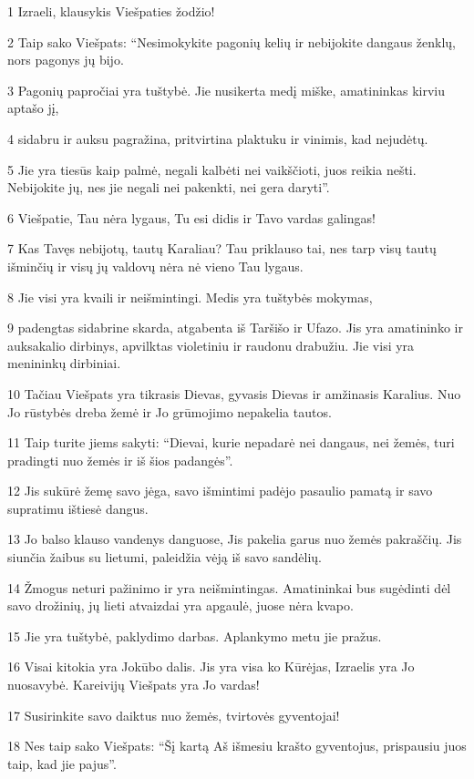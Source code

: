 \par 1 Izraeli, klausykis Viešpaties žodžio! 
\par 2 Taip sako Viešpats: “Nesimokykite pagonių kelių ir nebijokite dangaus ženklų, nors pagonys jų bijo. 
\par 3 Pagonių papročiai yra tuštybė. Jie nusikerta medį miške, amatininkas kirviu aptašo jį, 
\par 4 sidabru ir auksu pagražina, pritvirtina plaktuku ir vinimis, kad nejudėtų. 
\par 5 Jie yra tiesūs kaip palmė, negali kalbėti nei vaikščioti, juos reikia nešti. Nebijokite jų, nes jie negali nei pakenkti, nei gera daryti”. 
\par 6 Viešpatie, Tau nėra lygaus, Tu esi didis ir Tavo vardas galingas! 
\par 7 Kas Tavęs nebijotų, tautų Karaliau? Tau priklauso tai, nes tarp visų tautų išminčių ir visų jų valdovų nėra nė vieno Tau lygaus. 
\par 8 Jie visi yra kvaili ir neišmintingi. Medis yra tuštybės mokymas, 
\par 9 padengtas sidabrine skarda, atgabenta iš Taršišo ir Ufazo. Jis yra amatininko ir auksakalio dirbinys, apvilktas violetiniu ir raudonu drabužiu. Jie visi yra menininkų dirbiniai. 
\par 10 Tačiau Viešpats yra tikrasis Dievas, gyvasis Dievas ir amžinasis Karalius. Nuo Jo rūstybės dreba žemė ir Jo grūmojimo nepakelia tautos. 
\par 11 Taip turite jiems sakyti: “Dievai, kurie nepadarė nei dangaus, nei žemės, turi pradingti nuo žemės ir iš šios padangės”. 
\par 12 Jis sukūrė žemę savo jėga, savo išmintimi padėjo pasaulio pamatą ir savo supratimu ištiesė dangus. 
\par 13 Jo balso klauso vandenys danguose, Jis pakelia garus nuo žemės pakraščių. Jis siunčia žaibus su lietumi, paleidžia vėją iš savo sandėlių. 
\par 14 Žmogus neturi pažinimo ir yra neišmintingas. Amatininkai bus sugėdinti dėl savo drožinių, jų lieti atvaizdai yra apgaulė, juose nėra kvapo. 
\par 15 Jie yra tuštybė, paklydimo darbas. Aplankymo metu jie pražus. 
\par 16 Visai kitokia yra Jokūbo dalis. Jis yra visa ko Kūrėjas, Izraelis yra Jo nuosavybė. Kareivijų Viešpats yra Jo vardas! 
\par 17 Susirinkite savo daiktus nuo žemės, tvirtovės gyventojai! 
\par 18 Nes taip sako Viešpats: “Šį kartą Aš išmesiu krašto gyventojus, prispausiu juos taip, kad jie pajus”. 

